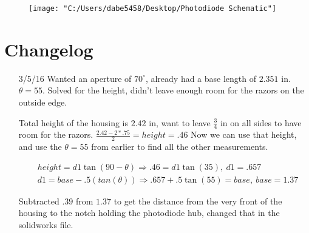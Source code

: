 \documentclass[10pt,letterpaper]{article}
\begin{document}
\begin{figure}
\centering
\texttt{[image: "C:/Users/dabe5458/Desktop/Photodiode Schematic"]}
\label{fig:PhotodiodeSchematic}
\end{figure}

\section*{Changelog}
\begin{itemize}
	\item[3/5/16] Wanted an aperture of $70^{\circ}$, already had a base length of $2.351$ in. $\theta = 55$.  Solved for the height, didn't leave enough room for the razors on the outside edge.  
	
	Total height of the housing is $2.42$ in, want to leave $\frac{3}{4}$ in on all sides to have room for the razors. $\frac{2.42 - 2*.75}{2} = height = .46$  Now we can use that height, and use the $\theta = 55$ from earlier to find all the other measurements. 
	
	\begin{align*}
	& height = d1 \tan ( 90 - \theta) \Rightarrow .46 = d1 \tan(35), \: d1 = .657 \\ 
	& d1 = base - .5(tan(\theta)) \Rightarrow .657 + .5 \tan(55) = base, \: base = 1.37
	\end{align*} 
	
	Subtracted $.39$ from $1.37$ to get the distance from the very front of the housing to the notch holding the photodiode hub, changed that in the solidworks file.  
\end{itemize}
\end{document}
